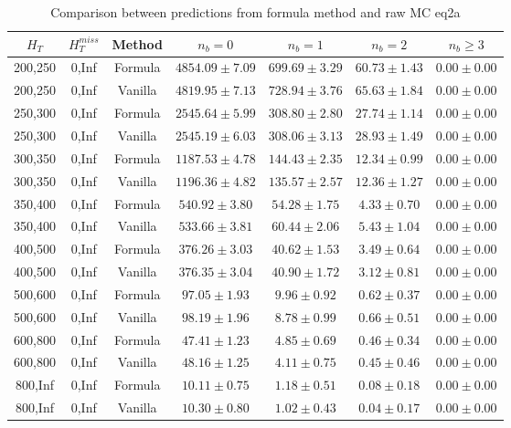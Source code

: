 \begin{longtable}{ | c | c | c | c | c | c | c | }
\caption{Comparison between predictions from formula method and raw MC eq2a} \label{tab:formula-eq2a} \\    \hline 
$H_{T}$ & $H_{T}^{miss}$ & Method & $n_{b} = 0$ & $n_{b} = 1$ & $n_{b} = 2$ & $n_{b} \ge 3$ \\ \hline200,250 & 0,Inf & Formula  & $  4854.09 \pm  7.09 $ & $   699.69 \pm  3.29 $ & $    60.73 \pm  1.43 $ & $     0.00 \pm  0.00 $  \\  
200,250 & 0,Inf & Vanilla  & $  4819.95 \pm  7.13 $ & $   728.94 \pm  3.76 $ & $    65.63 \pm  1.84 $ & $     0.00 \pm  0.00 $  \\ \hline 
250,300 & 0,Inf & Formula  & $  2545.64 \pm  5.99 $ & $   308.80 \pm  2.80 $ & $    27.74 \pm  1.14 $ & $     0.00 \pm  0.00 $  \\  
250,300 & 0,Inf & Vanilla  & $  2545.19 \pm  6.03 $ & $   308.06 \pm  3.13 $ & $    28.93 \pm  1.49 $ & $     0.00 \pm  0.00 $  \\ \hline 
300,350 & 0,Inf & Formula  & $  1187.53 \pm  4.78 $ & $   144.43 \pm  2.35 $ & $    12.34 \pm  0.99 $ & $     0.00 \pm  0.00 $  \\  
300,350 & 0,Inf & Vanilla  & $  1196.36 \pm  4.82 $ & $   135.57 \pm  2.57 $ & $    12.36 \pm  1.27 $ & $     0.00 \pm  0.00 $  \\ \hline 
350,400 & 0,Inf & Formula  & $   540.92 \pm  3.80 $ & $    54.28 \pm  1.75 $ & $     4.33 \pm  0.70 $ & $     0.00 \pm  0.00 $  \\  
350,400 & 0,Inf & Vanilla  & $   533.66 \pm  3.81 $ & $    60.44 \pm  2.06 $ & $     5.43 \pm  1.04 $ & $     0.00 \pm  0.00 $  \\ \hline 
400,500 & 0,Inf & Formula  & $   376.26 \pm  3.03 $ & $    40.62 \pm  1.53 $ & $     3.49 \pm  0.64 $ & $     0.00 \pm  0.00 $  \\  
400,500 & 0,Inf & Vanilla  & $   376.35 \pm  3.04 $ & $    40.90 \pm  1.72 $ & $     3.12 \pm  0.81 $ & $     0.00 \pm  0.00 $  \\ \hline 
500,600 & 0,Inf & Formula  & $    97.05 \pm  1.93 $ & $     9.96 \pm  0.92 $ & $     0.62 \pm  0.37 $ & $     0.00 \pm  0.00 $  \\  
500,600 & 0,Inf & Vanilla  & $    98.19 \pm  1.96 $ & $     8.78 \pm  0.99 $ & $     0.66 \pm  0.51 $ & $     0.00 \pm  0.00 $  \\ \hline 
600,800 & 0,Inf & Formula  & $    47.41 \pm  1.23 $ & $     4.85 \pm  0.69 $ & $     0.46 \pm  0.34 $ & $     0.00 \pm  0.00 $  \\  
600,800 & 0,Inf & Vanilla  & $    48.16 \pm  1.25 $ & $     4.11 \pm  0.75 $ & $     0.45 \pm  0.46 $ & $     0.00 \pm  0.00 $  \\ \hline 
800,Inf & 0,Inf & Formula  & $    10.11 \pm  0.75 $ & $     1.18 \pm  0.51 $ & $     0.08 \pm  0.18 $ & $     0.00 \pm  0.00 $  \\  
800,Inf & 0,Inf & Vanilla  & $    10.30 \pm  0.80 $ & $     1.02 \pm  0.43 $ & $     0.04 \pm  0.17 $ & $     0.00 \pm  0.00 $  \\ \hline 
    \hline 
    \hline 
\end{longtable}